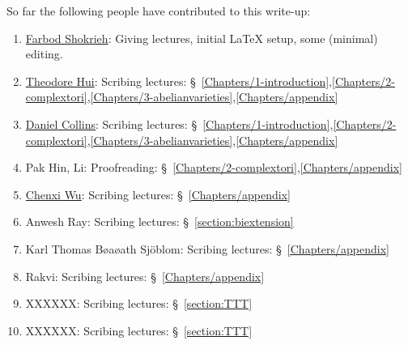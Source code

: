 



\vspace{+.5cm}

So far the following people have contributed to this write-up:
\begin{enumerate}
\item \href{http://www.math.cornell.edu/~farbod}{Farbod Shokrieh}: Giving lectures, initial LaTeX setup, some (minimal) editing.
\item \href{http://www.math.cornell.edu/m/People/bynetid/hh535}{Theodore Hui}: Scribing lectures: \S~\ref{Chapters/1-introduction},\ref{Chapters/2-complextori},\ref{Chapters/3-abelianvarieties},\ref{Chapters/appendix}
\item \href{https://www.math.cornell.edu/m/People/bynetid/djc224}{Daniel Collins}: Scribing lectures: \S~\ref{Chapters/1-introduction},\ref{Chapters/2-complextori},\ref{Chapters/3-abelianvarieties},\ref{Chapters/appendix}
\item Pak Hin, Li: Proofreading: \S~\ref{Chapters/2-complextori},\ref{Chapters/appendix}
\item \href{http://www.math.cornell.edu/~wuchenxi/}{Chenxi Wu}: Scribing lectures: \S~\ref{Chapters/appendix}
\item Anwesh Ray: Scribing lectures: \S~\ref{section:biextension}
\item Karl Thomas B\o{a}\o{a}th Sj\"{o}blom: Scribing lectures: \S~\ref{Chapters/appendix}
\item Rakvi: Scribing lectures: \S~\ref{Chapters/appendix}
\item XXXXXX: Scribing lectures: \S~\ref{section:TTT}
\item XXXXXX: Scribing lectures: \S~\ref{section:TTT}
\end{enumerate}



